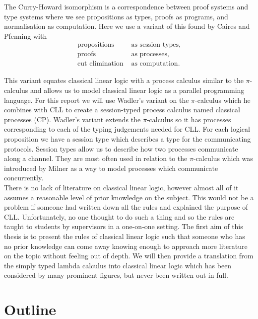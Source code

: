 \noindent
The Curry-Howard isomorphism is a correspondence between proof systems and type systems where we see propositions as 
types, proofs as programs, and normalisation as computation. Here we use a variant of this found by Caires and Pfenning 
\cite{caires2010} with 
\begin{align*}
    \text{propositions }& \text{as session types,} \\
    \text{proofs } & \text{as processes,} \\
    \text{cut elimination } & \text{as computation.} 
\end{align*}

\noindent
This variant equates classical linear logic with a process calculus similar to the $\pi$-calculus and allows 
us to model classical linear logic as a parallel programming language. For this report we will use Wadler's 
\cite{wadler2014} variant on the $\pi$-calculus which he combines with CLL to create a session-typed process calculus 
named classical processes (CP). Wadler's variant extends the $\pi$-calculus so it has processes corresponding to 
each of the typing judgements needed for CLL. For each logical proposition we have a session type which 
describes a type for the communicating protocols. Session types allow us to describe how two processes 
communicate along a channel. They are most often used in relation to the $\pi$-calculus which was introduced 
by Milner \cite{milner1992} as a way to model processes which communicate concurrently. \\

\noindent
There is no lack of literature on classical linear logic, however almost all of it assumes a reasonable 
level of prior knowledge on the subject. This would not be a problem if someone had written down all the 
rules and explained the purpose of CLL. Unfortunately, no one thought to do such a thing and so the rules 
are taught to students by supervisors in a one-on-one setting. The first aim of this thesis is to present 
the rules of classical linear logic such that someone who has no prior knowledge can come away knowing 
enough to approach more literature on the topic without feeling out of depth. We will then provide a 
translation from the simply typed lambda calculus into classical linear logic which has been considered 
by many prominent figures, but never been written out in full. \\

\section{Outline}

